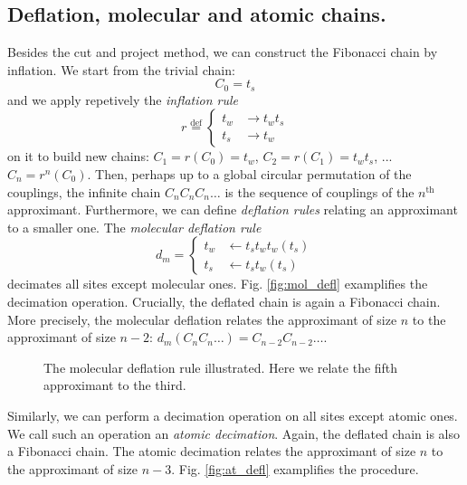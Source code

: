 \documentclass[11pt]{article}
\newcommand{\define}{\ensuremath{ \overset{\text{def}}{=} }}
\begin{document}
\subsection{Deflation, molecular and atomic chains.}
Besides the cut and project method, we can construct the Fibonacci chain by inflation.
We start from the trivial chain:
\begin{equation}
	C_0 = t_s
\end{equation}
and we apply repetively the \emph{inflation rule}
\begin{equation}
	r \define \begin{cases}
        t_{w} & \rightarrow t_w t_s \\
        t_s & \rightarrow t_w
      \end{cases}
\end{equation} 
on it to build new chains: $C_1 = r(C_0) = t_w$, $C_2 = r(C_1) = t_w t_s$, ... $C_n = r^n(C_0)$.
Then, perhaps up to a global circular permutation of the couplings, the infinite chain $C_n C_n C_n \dots$ is the sequence of couplings of the $n^\text{th}$ approximant.
Furthermore, we can define \emph{deflation rules} relating an approximant to a smaller one.
The \emph{molecular deflation rule}
\begin{equation}
	d_m = \begin{cases}
        t_{w} & \leftarrow t_s t_w t_w (t_s)\\
        t_s & \leftarrow t_s t_w (t_s)
      \end{cases}
\end{equation}
decimates all sites except molecular ones. Fig. \eqref{fig:mol_defl} examplifies the decimation operation.
Crucially, the deflated chain is again a Fibonacci chain. More precisely, the molecular deflation relates the approximant of size $n$ to the approximant of size $n-2$: $d_m(C_n C_n \dots) = C_{n-2} C_{n-2} \dots$.

\begin{figure}[htp]
	\centering
	
	\caption{The molecular deflation rule illustrated. Here we relate the fifth approximant to the third.}
\label{fig:mol_defl}
\end{figure}

Similarly, we can perform a decimation operation on all sites except atomic ones. We call such an operation an \emph{atomic decimation}.
Again, the deflated chain is also a Fibonacci chain.
The atomic decimation relates the approximant of size $n$ to the approximant of size $n-3$. 
Fig. \eqref{fig:at_defl} examplifies the procedure.
\end{document}
